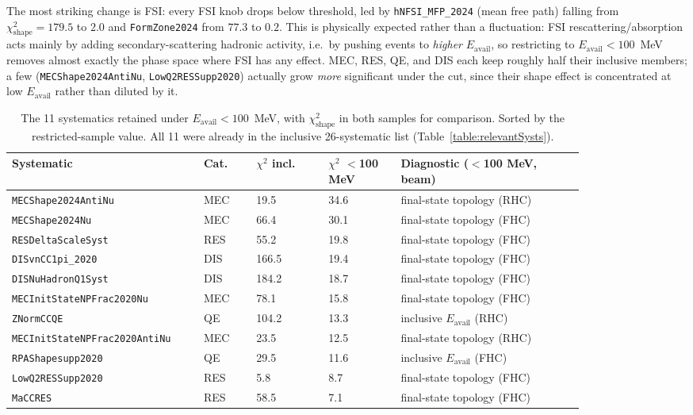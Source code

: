 The most striking change is FSI: every FSI knob drops below threshold,
led by \texttt{hNFSI\_MFP\_2024} (mean free path) falling from
$\chi^2_{\mathrm{shape}}=179.5$ to $2.0$ and \texttt{FormZone2024} from
$77.3$ to $0.2$. This is physically expected rather than a fluctuation: FSI
rescattering/absorption acts mainly by adding secondary-scattering hadronic
activity, i.e.\ by pushing events to \emph{higher} $E_{\mathrm{avail}}$, so
restricting to $E_{\mathrm{avail}}<100$~MeV removes almost exactly the phase
space where FSI has any effect. MEC, RES, QE, and DIS each keep roughly
half their inclusive members; a few (\texttt{MECShape2024AntiNu},
\texttt{LowQ2RESSupp2020}) actually grow \emph{more} significant under the
cut, since their shape effect is concentrated at low $E_{\mathrm{avail}}$
rather than diluted by it.

\begin{table}[htbp]
    \centering
    \caption{The 11 systematics retained under $E_{\mathrm{avail}}<100$~MeV,
    with $\chi^2_{\mathrm{shape}}$ in both samples for comparison. Sorted by
    the restricted-sample value. All 11 were already in the inclusive
    26-systematic list (Table~\ref{table:relevantSysts}).}
    \label{table:relevantSystsQ0Lt100MeV}
    \begin{tabular}{p{0.26\linewidth} p{0.08\linewidth} p{0.11\linewidth} p{0.11\linewidth} p{0.28\linewidth}}
        \toprule
        \textbf{Systematic} & \textbf{Cat.} & \textbf{$\chi^2$ incl.} & \textbf{$\chi^2$ $<$100 MeV} & \textbf{Diagnostic ($<$100 MeV, beam)} \\
        \midrule
        \texttt{MECShape2024AntiNu}           & MEC & 19.5  & 34.6 & final-state topology (RHC) \\
        \texttt{MECShape2024Nu}               & MEC & 66.4  & 30.1 & final-state topology (FHC) \\
        \texttt{RESDeltaScaleSyst}             & RES & 55.2  & 19.8 & final-state topology (FHC) \\
        \texttt{DISvnCC1pi\_2020}              & DIS & 166.5 & 19.4 & final-state topology (FHC) \\
        \texttt{DISNuHadronQ1Syst}             & DIS & 184.2 & 18.7 & final-state topology (FHC) \\
        \texttt{MECInitStateNPFrac2020Nu}      & MEC & 78.1  & 15.8 & final-state topology (FHC) \\
        \texttt{ZNormCCQE}                     & QE  & 104.2 & 13.3 & inclusive $E_{\mathrm{avail}}$ (RHC) \\
        \texttt{MECInitStateNPFrac2020AntiNu}  & MEC & 23.5  & 12.5 & final-state topology (RHC) \\
        \texttt{RPAShapesupp2020}              & QE  & 29.5  & 11.6 & inclusive $E_{\mathrm{avail}}$ (FHC) \\
        \texttt{LowQ2RESSupp2020}              & RES & 5.8   & 8.7  & final-state topology (FHC) \\
        \texttt{MaCCRES}                       & RES & 58.5  & 7.1  & final-state topology (FHC) \\
        \bottomrule
    \end{tabular}
\end{table}

